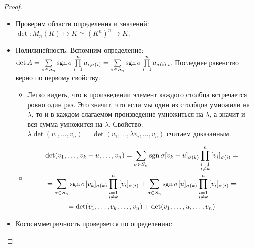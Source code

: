 \begin{proof}
\begin{enumerate}
            \begin{itemize}
                \item Проверим области определения и значений: $\det\colon M_n(K)\mapsto K \simeq (K^n)^n \mapsto K$.
                \item Полилинейность:
                    Вспомним определение: 
                    $\det A = \sum\limits_{\sigma\in S_n} {\operatorname{sgn}\sigma \prod\limits_{i = 1}^{n}{a_{i, \sigma(i)}}}
                    = \sum\limits_{\sigma\in S_n} {\operatorname{sgn}\sigma \prod\limits_{i = 1}^{n}{a_{\sigma(i), i}}}$. 
                    Последнее равенство верно по первому свойству.
                    \begin{itemize}
                        \item 
                            Легко видеть, что в произведении элемент каждого столбца встречается ровно один раз.
                            Это значит, что если мы один из столбцов умножили на $\lambda$, то и в каждом слагаемом
                            произведение умножиться на $\lambda$, а значит и вся сумма умножится на $\lambda$. 
                            Свойство: $\lambda \det (v_1,\dots, v_n) = \det (v_1, \dots, \lambda v_i, \dots, v_n)$
                            считаем доказанным.
                        \item
                            \[
                            \begin{gathered}
                                \det (v_1,\dots, v_k + u, \dots, v_n) = 
                                \sum\limits_{\sigma\in S_n} {\operatorname{sgn}\sigma[v_k + u]_{\sigma(k)} \prod\limits_{\substack{i = 1\\i\not=k}}^{n}{[v_i]_{\sigma(i)}}}=\\=
                                \sum\limits_{\sigma\in S_n} {\operatorname{sgn}\sigma[v_k]_{\sigma(k)} \prod\limits_{\substack{i = 1\\i\not=k}}^{n}{[v_i]_{\sigma(i)}}}+
                                \sum\limits_{\sigma\in S_n} {\operatorname{sgn}\sigma[u]_{\sigma(k)} \prod\limits_{\substack{i = 1\\i\not=k}}^{n}{[v_i]_{\sigma(i)}}}=\\=
                                \det (v_1,\dots, v_k, \dots, v_n) + 
                                \det (v_1,\dots, u, \dots, v_n) 
                            \end{gathered}
                            \] 
                    \end{itemize}
                \item Кососимметричность проверяется по определению:

\end{itemize}
\end{enumerate}
\end{proof}
